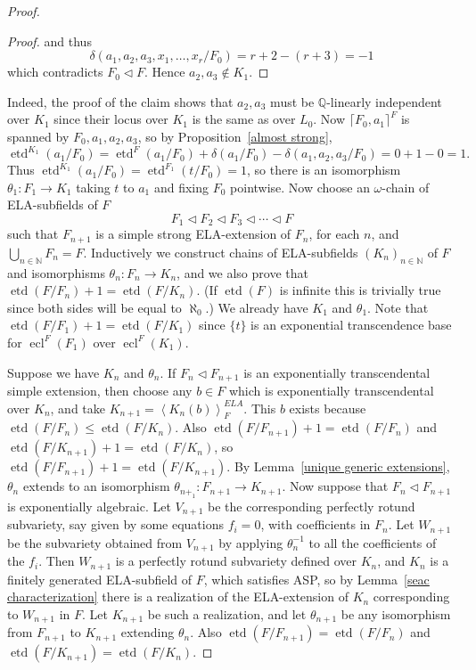 \documentclass[12pt]{amsart}
\theoremstyle{definition}
\begin{document}
\begin{proof}
\begin{proof}
and thus
\[\delta(a_1,a_2,a_3,x_1,\ldots,x_r/F_0) = r+2 - (r+3) = -1\]
which contradicts $F_0 {\ensuremath{\lhd}} F$. Hence $a_2,a_3 \notin K_1$.
\end{proof}
Indeed, the proof of the claim shows that $a_2,a_3$ must be ${\ensuremath{\mathbb{Q}}}$-linearly independent over $K_1$ since their locus over $K_1$ is the same as over $L_0$. Now ${\ensuremath{\lceil {F_0,a_1}\rceil}}^F$ is spanned by $F_0,a_1,a_2,a_3$, so by Proposition~\ref{almost strong}, 
\[\operatorname{etd}^{K_1}(a_1/F_0) = \operatorname{etd}^{F}(a_1/F_0) + \delta(a_1/F_0) - \delta(a_1,a_2,a_3/F_0) = 0+1-0 = 1.\]
Thus $\operatorname{etd}^{K_1}(a_1/F_0) = \operatorname{etd}^{F_1}(t/F_0) = 1$, so there is an isomorphism
$\theta_1:F_1 \to K_1$ taking $t$ to $a_1$ and fixing $F_0$ pointwise. Now choose an $\omega$-chain of ELA-subfields of $F$
\[F_1 {\ensuremath{\lhd}} F_2 {\ensuremath{\lhd}} F_3 {\ensuremath{\lhd}} \cdots {\ensuremath{\lhd}} F\]
such that $F_{n+1}$ is a simple strong ELA-extension of $F_n$, for each $n$, and $\bigcup_{n \in {\ensuremath{\mathbb{N}}}}F_n = F$. Inductively we construct chains of ELA-subfields $(K_n)_{n \in {\ensuremath{\mathbb{N}}}}$ of $F$ and isomorphisms $\theta_n:F_n \to K_n$, and we also prove that $\operatorname{etd}(F/F_n) +1 = \operatorname{etd}(F/K_n)$. (If $\operatorname{etd}(F)$ is infinite this is trivially true since both sides will be equal to $\aleph_0$.) We already have $K_1$ and $\theta_1$. Note that $\operatorname{etd}(F/F_1) + 1 = \operatorname{etd}(F/K_1)$ since $\{t\}$ is an exponential transcendence base for $\operatorname{ecl}^F(F_1)$ over $\operatorname{ecl}^F(K_1)$.

Suppose we have $K_n$ and $\theta_n$. If $F_n {\ensuremath{\lhd}} F_{n+1}$ is an exponentially transcendental simple extension, then choose any $b \in F$ which is exponentially transcendental over $K_n$, and take $K_{n+1} = {\ensuremath{\left\langle {K_n(b)} \right\rangle}}^{ELA}_F$. This $b$ exists because $\operatorname{etd}(F/F_n) {\ensuremath{\leqslant}} \operatorname{etd}(F/K_n)$. Also $\operatorname{etd}(F/F_{n+1}) + 1 = \operatorname{etd}(F/F_n)$ and $\operatorname{etd}(F/K_{n+1}) + 1 = \operatorname{etd}(F/K_n)$, so $\operatorname{etd}(F/F_{n+1}) +1 = \operatorname{etd}(F/K_{n+1})$. By Lemma~\ref{unique generic extensions}, $\theta_n$ extends to an isomorphism $\theta_{n+_1}: F_{n+1} \to K_{n+1}$. 
Now suppose that $F_n {\ensuremath{\lhd}} F_{n+1}$ is exponentially algebraic. Let $V_{n+1}$ be the corresponding perfectly rotund subvariety, say given by some equations $f_i = 0$, with coefficients in $F_n$. Let $W_{n+1}$ be the subvariety obtained from $V_{n+1}$ by applying $\theta_n^{-1}$ to all the coefficients of the $f_i$. Then $W_{n+1}$ is a perfectly rotund subvariety defined over $K_n$, and $K_n$ is a finitely generated ELA-subfield of $F$, which satisfies ASP, so by Lemma~\ref{seac characterization} there is a realization of the ELA-extension of $K_n$ corresponding to $W_{n+1}$ in $F$. Let $K_{n+1}$ be such a realization, and let $\theta_{n+1}$ be any isomorphism from $F_{n+1}$ to $K_{n+1}$ extending $\theta_n$. Also $\operatorname{etd}(F/F_{n+1}) = \operatorname{etd}(F/F_n)$ and $\operatorname{etd}(F/K_{n+1}) = \operatorname{etd}(F/K_n)$.


\end{proof}
\end{document}
